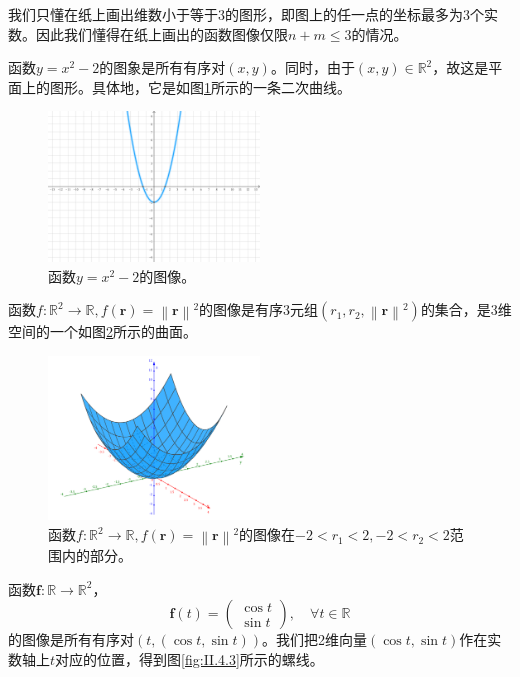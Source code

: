 \documentclass[main.tex]{subfiles}
\begin{document}
我们只懂在纸上画出维数小于等于3的图形，即图上的任一点的坐标最多为3个实数。因此我们懂得在纸上画出的函数图像仅限$n+m\leq3$的情况。
\begin{example}\label{exp:II.4.4}
    函数$y=x^2-2$的图象是所有有序对$\left(x,y\right)$。同时，由于$\left(x,y\right)\in\mathbb{R}^2$，故这是平面上的图形。具体地，它是如图\ref{fig:II.4.1}所示的一条二次曲线。
\end{example}
\begin{figure}[ht]
    \centering
    \includegraphics[width=0.5\textwidth]{images/II.4.1.png}
    \caption{函数$y=x^2-2$的图像。}
    \label{fig:II.4.1}
\end{figure}
\begin{example}\label{exp:II.4.5}
    函数$f:\mathbb{R}^2\rightarrow\mathbb{R},f\left(\mathbf{r}\right)=\left\|\mathbf{r}\right\|^2$的图像是有序3元组$\left(r_1,r_2,\left\|\mathbf{r}\right\|^2\right)$的集合，是3维空间的一个如图\ref{fig:II.4.2}所示的曲面。
\end{example}
\begin{figure}[ht]
    \centering
    \includegraphics[width=0.5\textwidth]{images/II.4.2.png}
    \caption{函数$f:\mathbb{R}^2\rightarrow\mathbb{R},f\left(\mathbf{r}\right)=\left\|\mathbf{r}\right\|^2$的图像在$-2<r_1<2,-2<r_2<2$范围内的部分。}
    \label{fig:II.4.2}
\end{figure}
\begin{example}\label{exp:II.4.6}
    函数$\mathbf{f}:\mathbb{R}\rightarrow\mathbb{R}^2$，
    \[
        \mathbf{f}\left(t\right)=\left(\begin{array}{c}\cos t\\\sin t\end{array}\right),\quad\forall t\in\mathbb{R}
    \]
    的图像是所有有序对$\left(t,\left(\cos t,\sin t\right)\right)$。我们把2维向量$\left(\cos t,\sin t\right)$作在实数轴上$t$对应的位置，得到图\ref{fig:II.4.3}所示的螺线。
\end{example}
\end{document}
